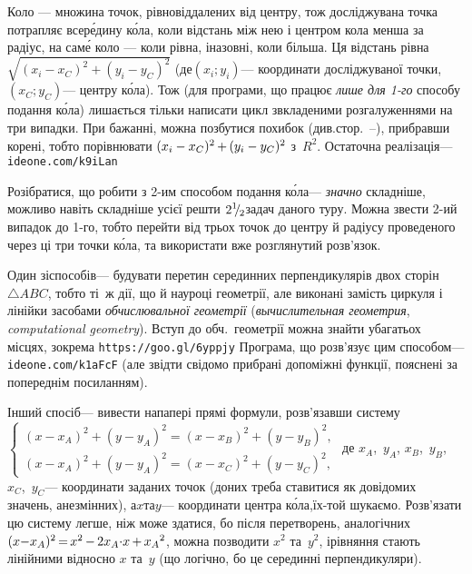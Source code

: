 \Tutorial	Коло --- множина точок, рівновіддалених від центру, тож досліджувана точка потрапляє всер\'{е}дину к\'{о}ла, коли відстань між нею і центром кола менша за радіус, на сам\'{е} коло --- коли рівна, і\nolinebreak[3] назовні, коли більша. Ця відстань рівна $\sqrt{(x_i-x_C)^2+(y_i-y_C)^2}$ (де\nolinebreak[3] $(x_i; y_i)$\nolinebreak[3] --- координати досліджуваної точки, $(x_C; y_C)$\nolinebreak[3] --- центру к\'{о}ла). Тож (для програми, що працює \emph{лише для \mbox{1-го}} способу подання к\'{о}ла) лишається тільки написати цикл з\nolinebreak[3] вкладеними розгалуженнями на три випадки. При бажанні, можна позбутися похибок (див.\nolinebreak[3] стор.~\pageref{sec:floating-point}--\nolinebreak[3]\pageref{text:floating-point-end}), прибравши корені, тобто порівнювати ${(x_i-x_C)^2}\dib{{+}}{(y_i-y_C)^2}$ з~$R^2$. Остаточна реалізація\nolinebreak[3] --- \verb"ideone.com/k9iLan"

Розібратися, що робити з \mbox{2-им} способом подання к\'{о}ла\nolinebreak[3] --- \emph{значно} складніше, можливо навіть складніше усієї решти 
${2\lefteqn{{}^{1}}{}^{\,}\lefteqn{/}{}_{\,\,\,2}}$\nolinebreak[3] задач даного туру. Можна звести \mbox{2-ий} випадок до \mbox{1-го}, тобто перейти від трьох точок до центру й радіусу проведеного через ці три точки к\'{о}ла, та використати вже розглянутий розв'язок.

Один зі\nolinebreak[3] способів\nolinebreak[3] --- будувати перетин серединних перпендикулярів двох сторін $\triangle{}ABC$, тобто ті~ж дії, що й на\nolinebreak[3] уроці геометрії, але виконані замість циркуля і лінійки засобами \emph{обчислювальної геометрії} (\emph{вычислительная геометрия}, \emph{computational geometry}). Вступ до обч.~геометрії можна знайти у\nolinebreak[3] багатьох місцях, зокрема \verb"https://goo.gl/6yppjy"\hspace{0.5em plus 1em} Програма, що розв'язує цим способом\nolinebreak[3] --- \verb"ideone.com/k1aFcF" (але звідти свідомо прибрані допоміжні функції, пояснені за попереднім посиланням).

Інший спосіб\nolinebreak[3] --- вивести на\nolinebreak[3] папері прямі формули, розв'язавши систему
$\left\{
\begin{array}{c}
(x{-}x_A)^2+(y{-}y_A)^2 = (x{-}x_B)^2+(y{-}y_B)^2,\\
(x{-}x_A)^2+(y{-}y_A)^2 = (x{-}x_C)^2+(y{-}y_C)^2,
\end{array}
\right.$
де $x_A$,~$y_A$, $x_B$,~$y_B$, $x_C$,~$y_C$\nolinebreak[3] --- коор\-ди\-нати заданих точок (до\nolinebreak[3] них треба ставитися як до\nolinebreak[3] відомих значень, а\nolinebreak[3] не\nolinebreak[3] змінних), а\nolinebreak[3] $x$\nolinebreak[1] та\nolinebreak[3] $y$\nolinebreak[3] --- координати центра к\'{о}ла,\linebreak[1] їх-то\nolinebreak[1] й шукаємо. Розв'язати цю систему легше, ніж може здатися, бо після перетворень, аналогічних ${(x{-}x_A)^2}\dib{{=}}x^2\dib{{-}}2x_A{\cdot}x\dib{{+}}{x_A}^2$, можна позводити $x^2$ та~$y^2$, і\nolinebreak[3] рівняння стають лінійними відносно $x$ та~$y$ (що логічно, бо це серединні перпендикуляри).

